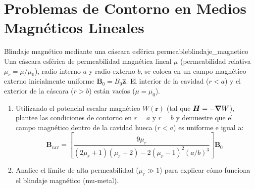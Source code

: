 \documentclass[11pt,a4paper]{book}
\newcommand{\zhat}{\hat{\bm{z}}}
\newcommand{\Bvec}{\bm{B}}
\newcommand{\Hvec}{\bm{H}}
\begin{document}
\section{Problemas de Contorno en Medios Magnéticos Lineales}

\begin{ejercicio}{Blindaje magnético mediante una cáscara esférica permeable}{blindaje_magnetico}
Una cáscara esférica de permeabilidad magnética lineal $\mu$ (permeabilidad relativa $\mu_r = \mu/\mu_0$), radio interno $a$ y radio externo $b$, se coloca en un campo magnético externo inicialmente uniforme $\Bvec_0 = B_0 \zhat$. El interior de la cavidad ($r < a$) y el exterior de la cáscara ($r > b$) están vacíos ($\mu = \mu_0$). 
\begin{enumerate}[label=\alph*)]
    \item Utilizando el potencial escalar magnético $W(\bm{r})$ (tal que $\Hvec = -\grad W$), plantee las condiciones de contorno en $r=a$ y $r=b$ y demuestre que el campo magnético dentro de la cavidad hueca ($r < a$) es uniforme e igual a:
    \begin{equation*}
        \Bvec_{\text{cav}} = \left[ \frac{9\mu_r}{(2\mu_r + 1)(\mu_r + 2) - 2(\mu_r - 1)^2 (a/b)^3} \right] \Bvec_0
    \end{equation*}
    \item Analice el límite de alta permeabilidad ($\mu_r \gg 1$) para explicar cómo funciona el blindaje magnético (mu-metal).
\end{enumerate}
\end{ejercicio}
\end{document}
